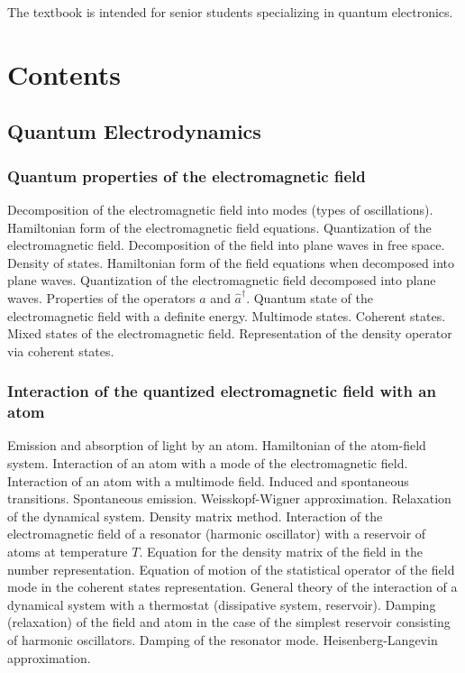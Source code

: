 The textbook is intended for senior students specializing
in quantum electronics.

\section{Contents}
\subsection{Quantum Electrodynamics}
\subsubsection{Quantum properties of the electromagnetic field}
Decomposition of the electromagnetic field into modes (types of oscillations).
Hamiltonian form of the electromagnetic field equations.
Quantization of the electromagnetic field.
Decomposition of the field into plane waves in free space.
Density of states.
Hamiltonian form of the field equations when decomposed into plane waves.
Quantization of the electromagnetic field decomposed into
plane waves.
Properties of the operators \( \hat a \) and \( \hat a^\dag \).
Quantum state of the electromagnetic field with a definite
  energy.
Multimode states.
Coherent states.
Mixed states of the electromagnetic field.
Representation of the density operator via coherent
states.
\subsubsection{Interaction of the quantized electromagnetic field with an atom}
Emission and absorption of light by an atom.
Hamiltonian of the atom-field system.
Interaction of an atom with a mode of the electromagnetic field.
Interaction of an atom with a multimode field. Induced and
spontaneous transitions.
Spontaneous emission. Weisskopf-Wigner approximation.
Relaxation of the dynamical system. Density matrix method.
Interaction of the electromagnetic field of a resonator
(harmonic oscillator) with a reservoir of atoms at
temperature \(T\).
Equation for the density matrix of the field in the number
representation.
Equation of motion of the statistical operator of the field mode in
the coherent states representation.
General theory of the interaction of a dynamical system with
a thermostat (dissipative system, reservoir).
Damping (relaxation) of the field and atom in the case of the simplest
reservoir consisting of harmonic oscillators.
Damping of the resonator mode. Heisenberg-Langevin approximation.

